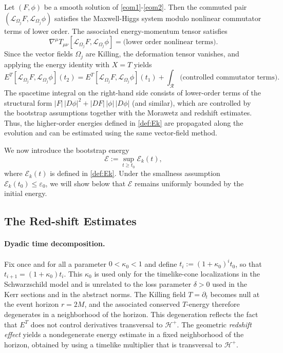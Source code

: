 \documentclass[11pt]{article}
\numberwithin{equation}{section}
\theoremstyle{plain}
\theoremstyle{definition}
\theoremstyle{remark}
\begin{document}
Let $(F,\phi)$ be a smooth solution of \eqref{eom1}-\eqref{eom2}.
Then the commuted pair $(\mathcal{L}_{\Omega_j}F,\mathcal{L}_{\Omega_j}\phi)$ satisfies the Maxwell-Higgs system modulo nonlinear commutator terms of lower order. The associated energy-momentum tensor satisfies
\begin{equation}
 \nabla^\mu T_{\mu\nu}[\mathcal{L}_{\Omega_j}F,\mathcal{L}_{\Omega_j}\phi]
=
\text{(lower order nonlinear terms)}.
\end{equation}
Since the vector fields $\Omega_j$ are Killing, the deformation tensor vanishes,
and applying the energy identity with $X=T$ yields
\begin{equation}
E^{T}[\mathcal{L}_{\Omega_j}F,\mathcal{L}_{\Omega_j}\phi](t_2)
=
E^{T}[\mathcal{L}_{\Omega_j}F,\mathcal{L}_{\Omega_j}\phi](t_1)
+
\int_{\mathcal{R}} \text{(controlled commutator terms)}.
\end{equation}
The spacetime integral on the right-hand side consists of lower-order terms
of the structural form $|F|\,|D\phi|^2 + |D F|\,|\phi|\,|D\phi|$ (and similar),
which are controlled by the bootstrap assumptions together with the Morawetz
and redshift estimates.
Thus, the higher-order energies defined in \eqref{def:Ek} are propagated along the evolution and can be estimated using the same vector-field method.

We now introduce the bootstrap energy
\begin{equation}
 \mathcal{E} := \sup_{t\ge t_0} \mathcal{E}_k(t),
\end{equation}
where $\mathcal{E}_k(t)$ is defined in \eqref{def:Ek}. Under the smallness assumption $\mathcal{E}_k(t_0)\le \varepsilon_0$,
we will show below that $\mathcal{E}$ remains uniformly bounded by the initial energy.





\subsection{The Red-shift Estimates}
\label{sec:redshift}


\paragraph{Dyadic time decomposition.} Fix once and for all a parameter $0<\kappa_0<1$ and define $t_i:=(1+\kappa_0)^i t_0$, so that $t_{i+1}=(1+\kappa_0)t_i$. This $\kappa_0$ is used only for the timelike-cone localizations in the Schwarzschild model and is unrelated to the loss parameter $\delta>0$ used in the Kerr sections and in the abstract norms.
The Killing field $T=\partial_t$ becomes null at the event horizon $r=2M$, and the associated conserved $T$-energy therefore degenerates in a neighborhood of the horizon. This degeneration reflects the fact that $E^{T}$ does not control derivatives transversal to $\mathcal H^{+}$. The geometric \emph{redshift effect} yields a nondegenerate energy estimate in a fixed neighborhood of the horizon, obtained by using a timelike multiplier that is transversal to $\mathcal H^{+}$.
\end{document}
